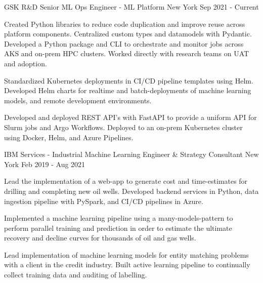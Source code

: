 \begin{cventries}
\cventrywide
  {GSK R\&D} %
  {Senior ML Ops Engineer - ML Platform} %
  {New York} %
  {Sep 2021 - Current} %
  {
    \begin{cvitems} %
      \item { Created Python libraries to reduce code duplication and improve reuse across platform components. Centralized custom types and datamodels with Pydantic. Developed a Python package and CLI to orchestrate and monitor jobs across AKS and on-prem HPC clusters. Worked directly with research teams on UAT and adoption. }
      \item { Standardized Kubernetes deployments in CI/CD pipeline templates using Helm. Developed Helm charts for realtime and batch-deployments of machine learning models, and remote development environments. }
      \item { Developed and deployed REST API's with FastAPI to provide a uniform API for Slurm jobs and Argo Workflows. Deployed to an on-prem Kubernetes cluster using Docker, Helm, and Azure Pipelines. }
    \end{cvitems}
  }
  \cventrywide
    {IBM Services - Industrial}  %
    {Machine Learning Engineer \& Strategy Consultant} %
    {New York} %
    {Feb 2019 - Aug 2021} %
    {
      \begin{cvitems} %
        \item {Lead the implementation of a web-app to generate cost and time-estimates for drilling and completing new oil wells. Developed backend services in Python, data ingestion pipeline with PySpark, and CI/CD pipelines in Azure.}
        \item {Implemented a machine learning pipeline using a many-models-pattern to perform parallel training and prediction in order to estimate the ultimate recovery and decline curves for thousands of oil and gas wells.}
        \item {Lead implementation of machine learning models for entity matching problems with a client in the credit industry. Built active learning pipeline to continually collect training data and auditing of labelling. }
      \end{cvitems}
    }


\end{cventries}
